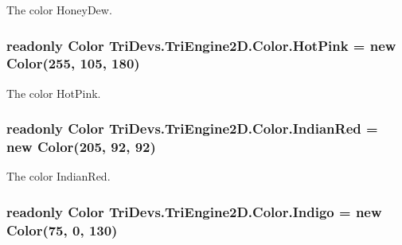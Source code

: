 The color Honey\-Dew. 

\hypertarget{struct_tri_devs_1_1_tri_engine2_d_1_1_color_a9fad7abf1e4034c747aa13f660eac3b8}{
\subsubsection[{Hot\-Pink}]{\setlength{\rightskip}{0pt plus 5cm}readonly {\bf Color} Tri\-Devs.\-Tri\-Engine2\-D.\-Color.\-Hot\-Pink = new {\bf Color}(255, 105, 180)\hspace{0.3cm}{\ttfamily [static]}}}\label{struct_tri_devs_1_1_tri_engine2_d_1_1_color_a9fad7abf1e4034c747aa13f660eac3b8}


The color Hot\-Pink. 

\hypertarget{struct_tri_devs_1_1_tri_engine2_d_1_1_color_a84329299011e48d1bcd7f6736ff5a38c}{
\subsubsection[{Indian\-Red}]{\setlength{\rightskip}{0pt plus 5cm}readonly {\bf Color} Tri\-Devs.\-Tri\-Engine2\-D.\-Color.\-Indian\-Red = new {\bf Color}(205, 92, 92)\hspace{0.3cm}{\ttfamily [static]}}}\label{struct_tri_devs_1_1_tri_engine2_d_1_1_color_a84329299011e48d1bcd7f6736ff5a38c}


The color Indian\-Red. 

\hypertarget{struct_tri_devs_1_1_tri_engine2_d_1_1_color_a232bdfc4e6f644b4b5da96643fb5f185}{
\subsubsection[{Indigo}]{\setlength{\rightskip}{0pt plus 5cm}readonly {\bf Color} Tri\-Devs.\-Tri\-Engine2\-D.\-Color.\-Indigo = new {\bf Color}(75, 0, 130)\hspace{0.3cm}{\ttfamily [static]}}}\label{struct_tri_devs_1_1_tri_engine2_d_1_1_color_a232bdfc4e6f644b4b5da96643fb5f185}


